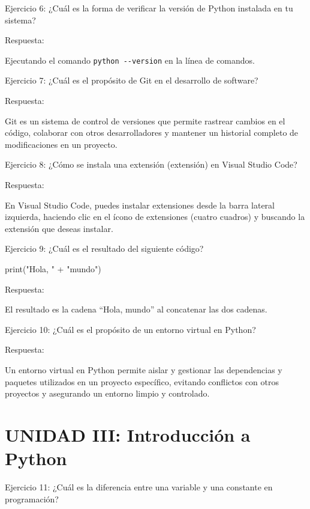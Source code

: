 \documentclass[
  a4paper,
  onepage,
  openany]{scrreprt}
\newenvironment{Shaded}{\begin{snugshade}}{\end{snugshade}}
\newcommand{\BuiltInTok}[1]{\textcolor[rgb]{0.00,0.23,0.31}{#1}}
\newcommand{\NormalTok}[1]{\textcolor[rgb]{0.00,0.23,0.31}{#1}}
\newcommand{\OperatorTok}[1]{\textcolor[rgb]{0.37,0.37,0.37}{#1}}
\newcommand{\StringTok}[1]{\textcolor[rgb]{0.13,0.47,0.30}{#1}}
\begin{document}
Ejercicio 6: ¿Cuál es la forma de verificar la versión de Python
instalada en tu sistema?

Respuesta:

Ejecutando el comando \texttt{python\ -\/-version} en la línea de
comandos.

Ejercicio 7: ¿Cuál es el propósito de Git en el desarrollo de software?

Respuesta:

Git es un sistema de control de versiones que permite rastrear cambios
en el código, colaborar con otros desarrolladores y mantener un
historial completo de modificaciones en un proyecto.

Ejercicio 8: ¿Cómo se instala una extensión (extensión) en Visual Studio
Code?

Respuesta:

En Visual Studio Code, puedes instalar extensiones desde la barra
lateral izquierda, haciendo clic en el ícono de extensiones (cuatro
cuadros) y buscando la extensión que deseas instalar.

Ejercicio 9: ¿Cuál es el resultado del siguiente código?

\begin{Shaded}
\begin{Highlighting}[]
\BuiltInTok{print}\NormalTok{(}\StringTok{"Hola, "} \OperatorTok{+} \StringTok{"mundo"}\NormalTok{)}
\end{Highlighting}
\end{Shaded}

Respuesta:

El resultado es la cadena ``Hola, mundo'' al concatenar las dos cadenas.

Ejercicio 10: ¿Cuál es el propósito de un entorno virtual en Python?

Respuesta:

Un entorno virtual en Python permite aislar y gestionar las dependencias
y paquetes utilizados en un proyecto específico, evitando conflictos con
otros proyectos y asegurando un entorno limpio y controlado.

\hypertarget{unidad-iii-introducciuxf3n-a-python-1}{%
\section{UNIDAD III: Introducción a
Python}\label{unidad-iii-introducciuxf3n-a-python-1}}

Ejercicio 11: ¿Cuál es la diferencia entre una variable y una constante
en programación?
\end{document}
